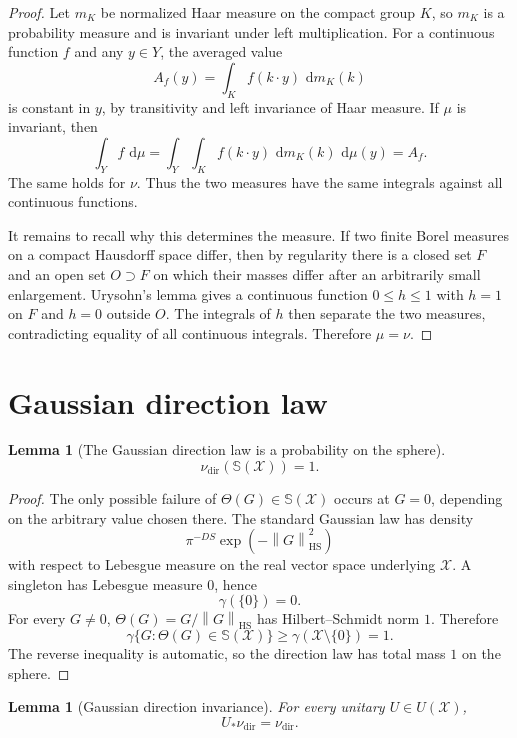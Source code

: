 \documentclass[11pt,oneside]{book}
\newtheorem{lemma}[theorem]{Lemma}
\newcommand{\1}{\mathbf 1}
\newcommand{\Sphere}{\mathbb S}
\newcommand{\HS}{\mathrm{HS}}
\newcommand{\dd}{\,\mathrm d}
\newcommand{\norm}[1]{\left\|#1\right\|}
\begin{document}
\begin{proof}
Let \(m_K\) be normalized Haar measure on the compact group \(K\), so \(m_K\)
is a probability measure and is invariant under left multiplication.  For a
continuous function \(f\) and any \(y\in Y\), the averaged value
\[
  A_f(y)=\int_K f(k\cdot y)\,\dd m_K(k)
\]
is constant in \(y\), by transitivity and left invariance of Haar measure.
If \(\mu\) is invariant, then
\[
  \int_Y f\,\dd\mu
  =
  \int_Y\int_K f(k\cdot y)\,\dd m_K(k)\,\dd\mu(y)
  =A_f.
\]
The same holds for \(\nu\).  Thus the two measures have the same integrals
against all continuous functions.

It remains to recall why this determines the measure.  If two finite Borel
measures on a compact Hausdorff space differ, then by regularity there is a
closed set \(F\) and an open set \(O\supset F\) on which their masses differ
after an arbitrarily small enlargement.  Urysohn's lemma gives a continuous
function \(0\le h\le1\) with \(h=1\) on \(F\) and \(h=0\) outside \(O\).  The
integrals of \(h\) then separate the two measures, contradicting equality of
all continuous integrals.  Therefore \(\mu=\nu\).
\end{proof}

\section{Gaussian direction law}

\begin{lemma}[The Gaussian direction law is a probability on the sphere]
\[
  \nu_{\mathrm{dir}}(\Sphere(\mathcal X))=1.
\]
\end{lemma}

\begin{proof}
The only possible failure of \(\Theta(G)\in\Sphere(\mathcal X)\) occurs at
\(G=0\), depending on the arbitrary value chosen there.  The standard Gaussian
law has density
\[
  \pi^{-DS}\exp(-\norm G_{\HS}^2)
\]
with respect to Lebesgue measure on the real vector space underlying
\(\mathcal X\).  A singleton has Lebesgue measure \(0\), hence
\[
  \gamma(\{0\})=0.
\]
For every \(G\ne0\), \(\Theta(G)=G/\norm G_{\HS}\) has Hilbert--Schmidt norm
\(1\).  Therefore
\[
  \gamma\{G:\Theta(G)\in\Sphere(\mathcal X)\}
  \ge \gamma(\mathcal X\setminus\{0\})=1.
\]
The reverse inequality is automatic, so the direction law has total mass
\(1\) on the sphere.
\end{proof}

\begin{lemma}[Gaussian direction invariance]
For every unitary \(U\in U(\mathcal X)\),
\[
  U_*\nu_{\mathrm{dir}}=\nu_{\mathrm{dir}}.
\]
\end{lemma}
\end{document}
